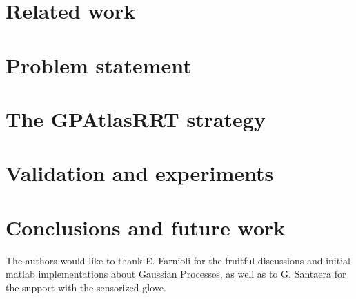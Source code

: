 \section{Related work}
\label{sec:related}



\section{Problem statement}
\label{sec:scope}



\section{The GPAtlasRRT strategy}
\label{sec:solution}



\section{Validation and experiments}
\label{sec:experiments}



\section{Conclusions and future work}
\label{sec:conclusions}



\begin{acknowledgements}
The authors would like to thank E. Farnioli for the fruitful discussions and initial matlab implementations about Gaussian Processes, as well as to G. Santaera for the support with the sensorized glove.
\end{acknowledgements}





